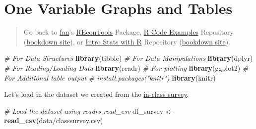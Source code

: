 \documentclass[
]{book}
\newenvironment{Shaded}{\begin{snugshade}}{\end{snugshade}}
\newcommand{\CommentTok}[1]{\textcolor[rgb]{0.56,0.35,0.01}{\textit{#1}}}
\newcommand{\KeywordTok}[1]{\textcolor[rgb]{0.13,0.29,0.53}{\textbf{#1}}}
\newcommand{\NormalTok}[1]{#1}
\newcommand{\StringTok}[1]{\textcolor[rgb]{0.31,0.60,0.02}{#1}}
\begin{document}
\hypertarget{one-variable-graphs-and-tables}{%
\section{One Variable Graphs and Tables}\label{one-variable-graphs-and-tables}}

\begin{quote}
Go back to \href{http://fanwangecon.github.io/}{fan}'s \href{https://fanwangecon.github.io/REconTools/}{REconTools} Package, \href{https://fanwangecon.github.io/R4Econ/}{R Code Examples} Repository (\href{https://fanwangecon.github.io/R4Econ/bookdown}{bookdown site}), or \href{https://fanwangecon.github.io/Stat4Econ/}{Intro Stats with R} Repository (\href{https://fanwangecon.github.io/Stat4Econ/bookdown}{bookdown site}).
\end{quote}

\begin{Shaded}
\begin{Highlighting}[]
\CommentTok{\# For Data Structures}
\KeywordTok{library}\NormalTok{(tibble)}
\CommentTok{\# For Data Manipulations}
\KeywordTok{library}\NormalTok{(dplyr)}
\CommentTok{\# For Reading/Loading Data}
\KeywordTok{library}\NormalTok{(readr)}
\CommentTok{\# For plotting}
\KeywordTok{library}\NormalTok{(ggplot2)}
\CommentTok{\# For Additional table output}
\CommentTok{\# install.packages("knitr")}
\KeywordTok{library}\NormalTok{(knitr)}
\end{Highlighting}
\end{Shaded}

Let's load in the dataset we created from the \href{https://fanwangecon.github.io/Stat4Econ/survey/htmlpdfr/classsurvey.html}{in-class survey}.

\begin{Shaded}
\begin{Highlighting}[]
\CommentTok{\# Load the dataset using readr\textquotesingle{}s read\_csv}
\NormalTok{df\_survey \textless{}{-}}\StringTok{ }\KeywordTok{read\_csv}\NormalTok{(}\StringTok{\textquotesingle{}data/classsurvey.csv\textquotesingle{}}\NormalTok{)}
\end{Highlighting}
\end{Shaded}
\end{document}
